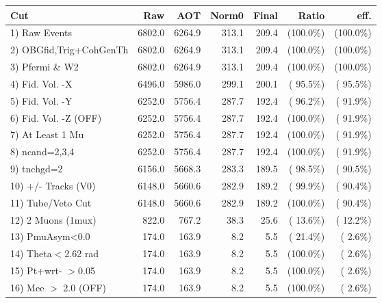  \begin{table}[h!]\centering
 \begin{tabular}{||l||r|r|r|r|r|r||}
 \hline
 \hline
 Cut & Raw & AOT & Norm0 & Final & Ratio & eff.       \\
 \hline
  1) Raw Events           &       6802.0 &       6264.9 &        313.1 &        209.4 & (100.0\%) & (100.0\%) \\
  2) OBGfid,Trig+CohGenTh &       6802.0 &       6264.9 &        313.1 &        209.4 & (100.0\%) & (100.0\%) \\
  3) Pfermi \& W2         &       6802.0 &       6264.9 &        313.1 &        209.4 & (100.0\%) & (100.0\%) \\
  4) Fid. Vol. -X         &       6496.0 &       5986.0 &        299.1 &        200.1 & ( 95.5\%) & ( 95.5\%) \\
  5) Fid. Vol. -Y         &       6252.0 &       5756.4 &        287.7 &        192.4 & ( 96.2\%) & ( 91.9\%) \\
  6) Fid. Vol. -Z (OFF)   &       6252.0 &       5756.4 &        287.7 &        192.4 & (100.0\%) & ( 91.9\%) \\
  7) At Least 1 Mu        &       6252.0 &       5756.4 &        287.7 &        192.4 & (100.0\%) & ( 91.9\%) \\
  8) ncand=2,3,4          &       6252.0 &       5756.4 &        287.7 &        192.4 & (100.0\%) & ( 91.9\%) \\
  9) tnchgd=2             &       6156.0 &       5668.3 &        283.3 &        189.5 & ( 98.5\%) & ( 90.5\%) \\
 10) +/- Tracks (V0)      &       6148.0 &       5660.6 &        282.9 &        189.2 & ( 99.9\%) & ( 90.4\%) \\
 11) Tube/Veto Cut        &       6148.0 &       5660.6 &        282.9 &        189.2 & (100.0\%) & ( 90.4\%) \\
 12) 2 Muons (1mux)       &        822.0 &        767.2 &         38.3 &         25.6 & ( 13.6\%) & ( 12.2\%) \\
 13) PmuAsym<0.0          &        174.0 &        163.9 &          8.2 &          5.5 & ( 21.4\%) & (  2.6\%) \\
 14) Theta$<$2.62 rad     &        174.0 &        163.9 &          8.2 &          5.5 & (100.0\%) & (  2.6\%) \\
 15) Pt+wrt- $>$0.05      &        174.0 &        163.9 &          8.2 &          5.5 & (100.0\%) & (  2.6\%) \\
 16) Mee $>$ 2.0  (OFF)   &        174.0 &        163.9 &          8.2 &          5.5 & (100.0\%) & (  2.6\%) \\

\end{tabular}
\end{table}
